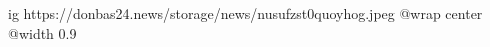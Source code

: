  
 
 
 
 

\ifcmt
  ig https://donbas24.news/storage/news/nusufzst0quoyhog.jpeg
  @wrap center
  @width 0.9
\fi
